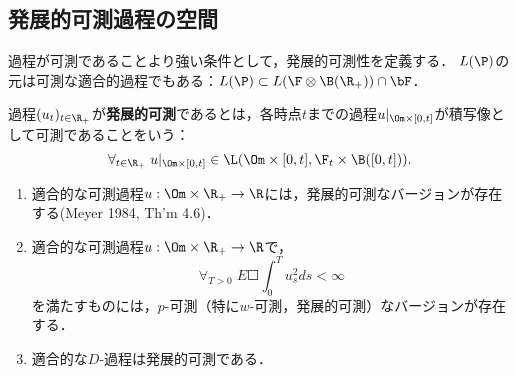 \documentclass[uplatex,dvipdfmx]{jsreport}
\begin{document}
\subsection{発展的可測過程の空間}

\begin{tcolorbox}[colframe=ForestGreen, colback=ForestGreen!10!white,breakable,colbacktitle=ForestGreen!40!white,coltitle=black,fonttitle=\bfseries\sffamily,
title=発展的可測性とは積空間上における$\P/\B(\R)$-可測性である]
    過程が可測であることより強い条件として，発展的可測性を定義する．
    $L(\P)$の元は可測な適合的過程でもある：$L(\P)\subset L(\F\otimes\B(\R_+))\cap\bF$．
\end{tcolorbox}

\begin{definition}
    過程$(u_t)_{t\in\R_+}$が\textbf{発展的可測}であるとは，各時点$t$までの過程$u|_{\Om\times[0,t]}$が積写像として可測であることをいう：
    \[\forall_{t\in\R_+}\;u|_{\Om\times[0,t]}\in\L(\Om\times[0,t],\F_t\times\B([0,t])).\]
\end{definition}

\begin{lemma}[発展的可測性の十分条件]\mbox{}
    \begin{enumerate}
        \item 適合的な可測過程$u:\Om\times\R_+\to\R$には，発展的可測なバージョンが存在する(Meyer 1984, Th'm 4.6)．
        \item 適合的な可測過程$u:\Om\times\R_+\to\R$で，
        \[\forall_{T>0}\;E\Square{\int^T_0u^2_sds}<\infty\]
        を満たすものには，$p$-可測（特に$w$-可測，発展的可測）なバージョンが存在する．
        \item 適合的な$D$-過程は発展的可測である．
    \end{enumerate}
\end{lemma}
\end{document}
